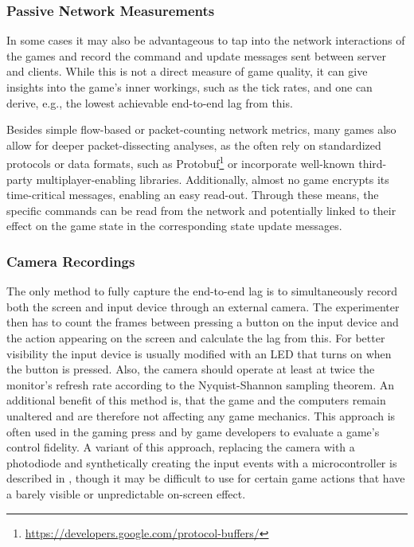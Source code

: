 \subsubsection{Passive Network Measurements}

In some cases it may also be advantageous to tap into the network interactions of the games and record the command and update messages sent between server and clients. While this is not a direct measure of game quality, it can give insights into the game's inner workings, such as the tick rates, and one can derive, e.g., the lowest achievable end-to-end lag from this.


Besides simple flow-based or packet-counting network metrics, many games also allow for deeper packet-dissecting analyses, as the often rely on standardized protocols or data formats, such as Protobuf\footnote{\url{https://developers.google.com/protocol-buffers/}} or incorporate well-known third-party multiplayer-enabling libraries. %
Additionally, almost no game encrypts its time-critical messages, enabling an easy read-out. Through these means, the specific commands can be read from the network and potentially linked to their effect on the game state in the corresponding state update messages.


\subsubsection{Camera Recordings}

The only method to fully capture the end-to-end lag is to simultaneously record both the screen and input device through an external camera. The experimenter then has to count the frames between pressing a button on the input device and the action appearing on the screen and calculate the lag from this. For better visibility the input device is usually modified with an LED that turns on when the button is pressed. Also, the camera should operate at least at twice the monitor's refresh rate according to the Nyquist-Shannon sampling theorem. An additional benefit of this method is, that the game and the computers remain unaltered and are therefore not affecting any game mechanics. This approach is often used in the gaming press and by game developers to evaluate a game's control fidelity. A variant of this approach, replacing the camera with a photodiode and synthetically creating the input events with a microcontroller is described in \cite{beyermethod}, though it may be difficult to use for certain game actions that have a barely visible or unpredictable on-screen effect.

